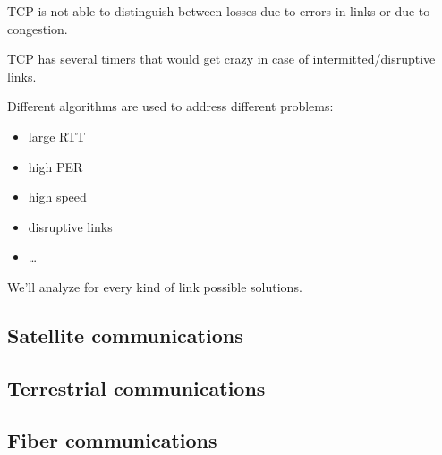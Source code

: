TCP is not able to distinguish between losses due to errors in links or due
to congestion.

TCP has several timers that would get crazy in case of intermitted/disruptive
links.

Different algorithms are used to address different problems:

\begin{itemize}
  \item large RTT
  \item high PER
  \item high speed
  \item disruptive links
  \item \dots
\end{itemize}

We'll analyze for every kind of link possible solutions.

\subsection{Satellite communications}

\subsection{Terrestrial communications}

\subsection{Fiber communications}
